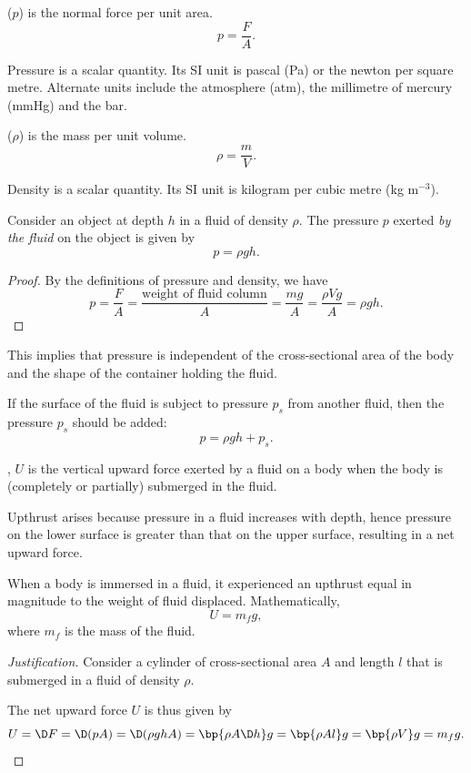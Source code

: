 \begin{definition}
     ($p$) is the normal force per unit area. \[p = \frac{F}{A}.\]
\end{definition}

Pressure is a scalar quantity. Its SI unit is pascal (Pa) or the newton per square metre. Alternate units include the atmosphere (atm), the millimetre of mercury (mmHg) and the bar.

\begin{definition}
     ($\rho$) is the mass per unit volume. \[\rho = \frac{m}{V}.\]
\end{definition}

Density is a scalar quantity. Its SI unit is kilogram per cubic metre (kg m$^{-3}$).

\begin{proposition}
    Consider an object at depth $h$ in a fluid of density $\rho$. The pressure $p$ exerted \emph{by the fluid} on the object is given by \[p = \rho g h.\]
\end{proposition}
\begin{proof}
    By the definitions of pressure and density, we have \[p = \frac{F}{A} = \frac{\text{weight of fluid column}}{A} = \frac{mg}{A} = \frac{\rho V g}{A} = \rho g h.\]
\end{proof}

This implies that pressure is independent of the cross-sectional area of the body and the shape of the container holding the fluid.

If the surface of the fluid is subject to pressure $p_s$ from another fluid, then the pressure $p_s$ should be added: \[p = \rho g h + p_s.\]

\begin{definition}
    , $U$ is the vertical upward force exerted by a fluid on a body when the body is (completely or partially) submerged in the fluid.
\end{definition}

Upthrust arises because pressure in a fluid increases with depth, hence pressure on the lower surface is greater than that on the upper surface, resulting in a net upward force.

\begin{principle}
    When a body is immersed in a fluid, it experienced an upthrust equal in magnitude to the weight of fluid displaced. Mathematically, \[U = m_f g,\] where $m_f$ is the mass of the fluid.
\end{principle}
\begin{proof}[Justification]
    Consider a cylinder of cross-sectional area $A$ and length $l$ that is submerged in a fluid of density $\rho$.

    The net upward force $U$ is thus given by \[U = \D F = \D (pA) = \D (\rho g h A) = \bp{\rho A \D h} g = \bp{\rho A l} g = \bp{\rho V} g = m_f g.\]
\end{proof}

